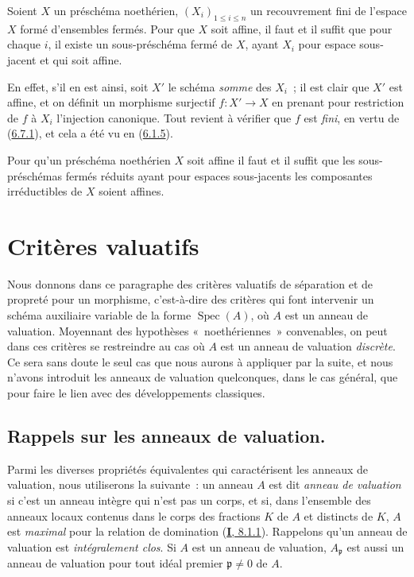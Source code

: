\begin{corollary}[6.7.2]
\label{II.6.7.2-fr}
Soient $X$ un préschéma noethérien, $(X_i)_{1\leq i\leq n}$ un recouvrement
fini de l'espace $X$ formé d'ensembles fermés. Pour que $X$ soit affine, il
faut et il suffit que pour chaque $i$, il existe un sous-préschéma fermé de
$X$, ayant $X_i$ pour espace sous-jacent et qui soit affine.
\end{corollary}

En effet, s'il en est ainsi, soit $X'$ le schéma \emph{somme} des $X_i$~; il
est clair que $X'$ est affine, et on définit un morphisme surjectif
$f:X'\to X$ en prenant pour restriction de $f$ à $X_i$ l'injection
canonique. Tout revient à vérifier que $f$ est \emph{fini}, en vertu de
(\hyperref[II.6.7.1-fr]{6.7.1}), et cela a été vu en
(\hyperref[II.6.1.5-fr]{6.1.5}).

\begin{corollary}[6.7.3]
\label{II.6.7.3-fr}
Pour qu'un préschéma noethérien $X$ soit affine il faut et il suffit que les
sous-préschémas fermés réduits ayant pour espaces sous-jacents les composantes
irréductibles de $X$ soient affines.
\end{corollary}

\section{Critères valuatifs}
\label{section:II.7-fr}

Nous donnons dans ce paragraphe des critères valuatifs de séparation et de
propreté pour un morphisme, c'est-à-dire des critères qui font intervenir un
schéma auxiliaire variable de la forme $\operatorname{Spec}(A)$, où $A$ est
un anneau de valuation. Moyennant des hypothèses «~noethériennes~»
convenables, on peut dans ces critères se restreindre au cas où $A$ est un
anneau de valuation \emph{discrète}. Ce sera sans doute le seul cas que nous
aurons à appliquer par la suite, et nous n'avons introduit les anneaux de
valuation quelconques, dans le cas général, que pour faire le lien avec des
développements classiques.

\subsection{Rappels sur les anneaux de valuation.}
\label{subsection:II.7.1-fr}

\begin{env}[7.1.1]
\label{II.7.1.1-fr}
Parmi les diverses propriétés équivalentes qui caractérisent les anneaux de
valuation, nous utiliserons la suivante~: un anneau $A$ est dit
\emph{anneau de valuation} si c'est un anneau intègre qui n'est pas un
corps, et si, dans l'ensemble des anneaux locaux contenus dans le corps des
fractions $K$ de $A$ et distincts de $K$, $A$ est \emph{maximal} pour la
relation de domination (\hyperref[I.8.1.1-fr]{\textbf{I}, 8.1.1}). Rappelons qu'un
anneau de valuation est \emph{intégralement clos}. Si $A$ est un anneau de
valuation, $A_{\mathfrak{p}}$ est aussi un anneau de valuation pour tout
idéal premier $\mathfrak{p}\neq0$ de $A$.
\end{env}

